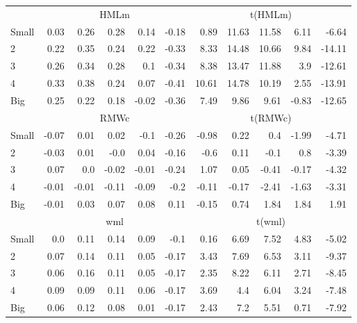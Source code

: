\begin{table}[!ht]
\begin{tabular}{lrrrrrrrrrr}
  

      & \multicolumn{5}{c}{HMLm} & \multicolumn{5}{c}{t(HMLm)} \\
    \cmidrule(r){2-6} \cmidrule(r){7-11}
      Small  & 0.03  & 0.26  & 0.28  & 0.14  & -0.18   & 0.89  & 11.63  & 11.58  & 6.11  & -6.64  \\
          2  & 0.22  & 0.35  & 0.24  & 0.22  & -0.33   & 8.33  & 14.48  & 10.66  & 9.84  & -14.11  \\
          3  & 0.26  & 0.34  & 0.28  & 0.1  & -0.34   & 8.38  & 13.47  & 11.88  & 3.9  & -12.61  \\
          4  & 0.33  & 0.38  & 0.24  & 0.07  & -0.41   & 10.61  & 14.78  & 10.19  & 2.55  & -13.91  \\
      Big    & 0.25  & 0.22  & 0.18  & -0.02  & -0.36   & 7.49  & 9.86  & 9.61  & -0.83  & -12.65  \\

  

      & \multicolumn{5}{c}{RMWc} & \multicolumn{5}{c}{t(RMWc)} \\
    \cmidrule(r){2-6} \cmidrule(r){7-11}
      Small  & -0.07  & 0.01  & 0.02  & -0.1  & -0.26   & -0.98  & 0.22  & 0.4  & -1.99  & -4.71  \\
          2  & -0.03  & 0.01  & -0.0  & 0.04  & -0.16   & -0.6  & 0.11  & -0.1  & 0.8  & -3.39  \\
          3  & 0.07  & 0.0  & -0.02  & -0.01  & -0.24   & 1.07  & 0.05  & -0.41  & -0.17  & -4.32  \\
          4  & -0.01  & -0.01  & -0.11  & -0.09  & -0.2   & -0.11  & -0.17  & -2.41  & -1.63  & -3.31  \\
      Big    & -0.01  & 0.03  & 0.07  & 0.08  & 0.11   & -0.15  & 0.74  & 1.84  & 1.84  & 1.91  \\

  

      & \multicolumn{5}{c}{wml} & \multicolumn{5}{c}{t(wml)} \\
    \cmidrule(r){2-6} \cmidrule(r){7-11}
      Small  & 0.0  & 0.11  & 0.14  & 0.09  & -0.1   & 0.16  & 6.69  & 7.52  & 4.83  & -5.02  \\
          2  & 0.07  & 0.14  & 0.11  & 0.05  & -0.17   & 3.43  & 7.69  & 6.53  & 3.11  & -9.37  \\
          3  & 0.06  & 0.16  & 0.11  & 0.05  & -0.17   & 2.35  & 8.22  & 6.11  & 2.71  & -8.45  \\
          4  & 0.09  & 0.09  & 0.11  & 0.06  & -0.17   & 3.69  & 4.4  & 6.04  & 3.24  & -7.48  \\
      Big    & 0.06  & 0.12  & 0.08  & 0.01  & -0.17   & 2.43  & 7.2  & 5.51  & 0.71  & -7.92  \\

  

  \bottomrule
\end{tabular}
\label{tbl:25_Size_Inv_BS2015}
\end{table}